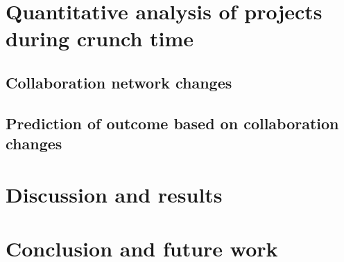 



\section{Quantitative analysis of projects during crunch time}
\subsection{Collaboration network changes}
\subsection{Prediction of outcome based on collaboration changes}

\section{Discussion and results}
\section{Conclusion and future work}
